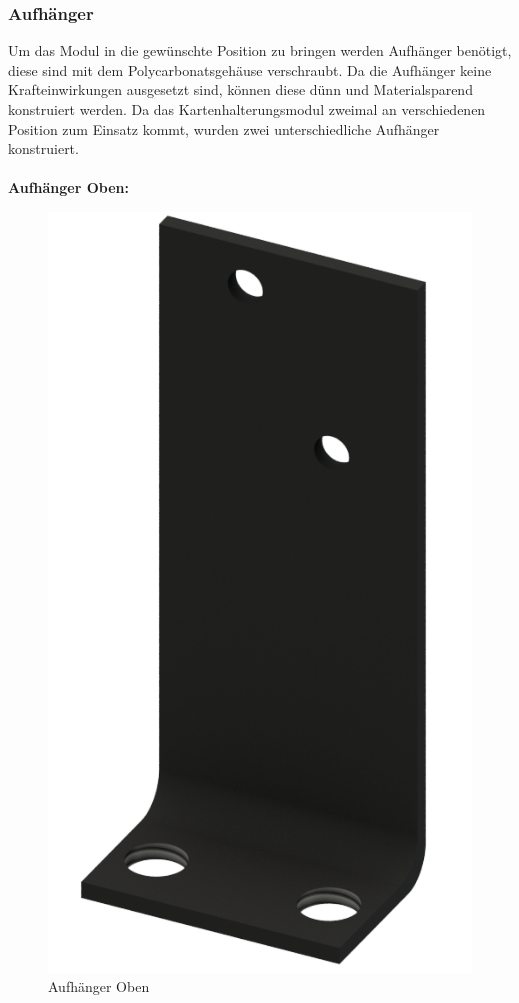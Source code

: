 \subsubsection{Aufhänger}
Um das Modul in die gewünschte Position zu bringen werden Aufhänger benötigt, diese sind mit dem Polycarbonatsgehäuse verschraubt.
Da die Aufhänger keine Krafteinwirkungen ausgesetzt sind, können diese dünn und Materialsparend konstruiert werden.
Da das Kartenhalterungsmodul zweimal an verschiedenen Position zum Einsatz kommt, wurden zwei unterschiedliche
Aufhänger konstruiert.\\\\
\textbf{Aufhänger Oben:} \\
\begin{figure}[H]
    \centering
    \includegraphics[scale = 0.2]{fig/mech/StopperObenKurz.png}
    \caption{Aufhänger Oben}
    \label{fig:Aufhänger Oben}
\end{figure}
